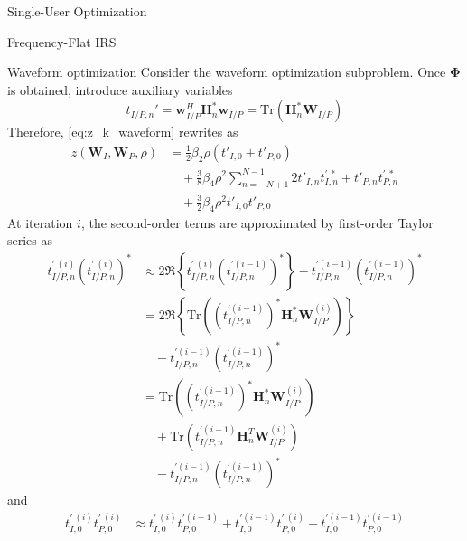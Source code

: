 \documentclass{IEEEtran}
\begin{document}
\begin{section}{Single-User Optimization}
\begin{subsection}{Frequency-Flat IRS}
		\begin{subsubsection}{Waveform optimization}
			Consider the waveform optimization subproblem. Once $\boldsymbol{\Phi}$ is obtained, introduce auxiliary variables
			\begin{equation}\label{eq:t'}
				t_{I/P,n}' = \boldsymbol{w}_{I/P}^H \boldsymbol{H}_n^* \boldsymbol{w}_{I/P} = \mathrm{Tr}(\boldsymbol{H}_n^*\boldsymbol{W}_{I/P})
			\end{equation}
			Therefore, \ref{eq:z_k_waveform} rewrites as
			\begin{equation}\label{eq:z_waveform}
				\begin{split}
					z(\boldsymbol{W}_I,\boldsymbol{W}_P,\rho)
					&=\frac{1}{2} \beta_2 \rho (t'_{I,0}+t'_{P,0})\\
					&\quad+\frac{3}{8} \beta_4 \rho^2 \sum_{n=-N+1}^{N-1}{2t'_{I,n}t_{I,n}^{\prime \ *}+t'_{P,n}t_{P,n}^{\prime \ *}}\\
					&\quad+\frac{3}{2} \beta_4 \rho^2 t'_{I,0}t'_{P,0}
				\end{split}
			\end{equation}
			At iteration $i$, the second-order terms are approximated by first-order Taylor series as
			\begin{equation}
				\begin{split}
					t_{I/P,n}^{\prime \ (i)} (t_{I/P,n}^{\prime \ (i)})^*
					& \approx 2 \Re\left\{t_{I/P,n}^{\prime \ (i)} (t_{I/P,n}^{\prime (i-1)})^*\right\} - t_{I/P,n}^{\prime (i-1)} (t_{I/P,n}^{\prime (i-1)})^* \\
					& = 2 \Re \left\{\mathrm{Tr}\left((t_{I/P,n}^{\prime (i-1)})^*\boldsymbol{H}_{n}^*\boldsymbol{W}_{I/P}^{(i)}\right)\right\}\\
					& \quad - t_{I/P,n}^{\prime (i-1)} (t_{I/P,n}^{\prime (i-1)})^*\\
					& = \mathrm{Tr}\left((t_{I/P,n}^{\prime (i-1)})^*\boldsymbol{H}_{n}^*\boldsymbol{W}_{I/P}^{(i)}\right)\\
					& \quad + \mathrm{Tr}\left(t_{I/P,n}^{\prime (i-1)}\boldsymbol{H}_{n}^T\boldsymbol{W}_{I/P}^{(i)}\right)\\
					& \quad - t_{I/P,n}^{\prime (i-1)} (t_{I/P,n}^{\prime (i-1)})^*
				\end{split}
			\end{equation}
			and
			\begin{equation}
				\begin{split}
					t_{I,0}^{\prime \ (i)} t_{P,0}^{\prime \ (i)}
					& \approx t_{I,0}^{\prime \ (i)} t_{P,0}^{\prime (i-1)} + t_{I,0}^{\prime (i-1)} t_{P,0}^{\prime \ (i)} - t_{I,0}^{\prime (i-1)} t_{P,0}^{\prime (i-1)}\\

\end{split}
\end{equation}
\end{subsubsection}
\end{subsection}
\end{section}
\end{document}
